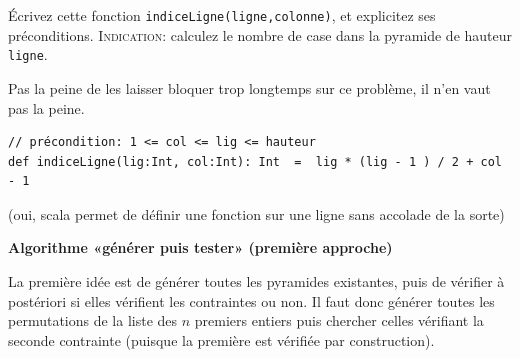 \documentclass[10pt]{article}\usepackage[correction,nu]{esial}
\begin{document}
\begin{Question}
  Écrivez cette fonction \texttt{indiceLigne(ligne,colonne)}, et explicitez ses préconditions.
  \noindent\textsc{Indication:} calculez le nombre de case dans la pyramide de
  hauteur \texttt{ligne}.
\end{Question}
\begin{Reponse}
  Pas la peine de les laisser bloquer trop longtemps sur ce problème, il n'en
  vaut pas la peine.

\begin{Verbatim}
// précondition: 1 <= col <= lig <= hauteur 
def indiceLigne(lig:Int, col:Int): Int  =  lig * (lig - 1 ) / 2 + col - 1
\end{Verbatim}
(oui, scala permet de définir une fonction sur une ligne sans accolade de la sorte)
\end{Reponse}




\begin{Exercice}\textbf{Algorithme «générer puis tester» (première approche)}

  \noindent La première idée est de générer toutes les pyramides existantes,
  puis de vérifier à postériori si elles vérifient les contraintes ou non. Il
  faut donc générer toutes les permutations de la liste des $n$ premiers
  entiers puis chercher celles vérifiant la seconde contrainte (puisque la
  première est vérifiée par construction).
\end{Exercice}
\end{document}
